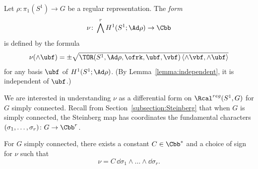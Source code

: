 \goodbreak
\begin{defi}\label{Def:peripheralform}
Let $\rho\colon\pi_1 (S^1)\to G$ be a regular representation. The \emph{form}
\[
\nu\colon \bigwedge^r H^1(S^1;\Ad\rho)\to \Cbb
\]
is defined by the formula
\begin{equation}\label{eqn:peripheral}
\nu (\wedge\ubf)=\pm \sqrt{ \TOR(S^1,\Ad\rho, \ofrk, \ubf,\vbf)
\, \langle \wedge\vbf, \wedge\ubf \rangle }
\end{equation}
for any basis $\ubf$ of $H^1(S^1;\Ad\rho)$. (By Lemma~\ref{lemma:independent}, it is independent of $\ubf$.)
\end{defi}


We are interested in understanding $\nu$ as a differential form on $\Rcal^{reg}(S^1, G)$ for $G$ simply connected. Recall from Section~\ref{subsection:Steinberg} that when $G$ is simply connected, the Steinberg map has coordinates the fundamental characters $(\sigma_1,\dots,\sigma_r)\colon G\to\Cbb^r$.

\begin{Proposition}\label{prop:nudsigma}
For $G$ simply connected, there exists a constant $C\in\Cbb^*$ and a choice of sign for $\nu$ such that
\[
\nu= C\, \dd\sigma_1\wedge\dots\wedge \dd\sigma_{r}.
\]
\end{Proposition}

